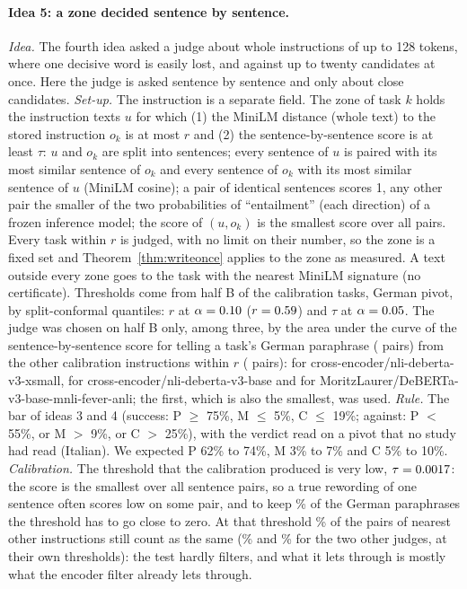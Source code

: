\paragraph{Idea 5: a zone decided sentence by sentence.} \emph{Idea.} The fourth idea asked a judge about whole instructions of up to 128 tokens, where one decisive word is easily lost, and against up to twenty candidates at once. Here the judge is asked sentence by sentence and only about close candidates. \emph{Set-up.} The instruction is a separate field. The zone of task $k$ holds the instruction texts $u$ for which (1) the MiniLM distance (whole text) to the stored instruction $o_k$ is at most $r$ and (2) the sentence-by-sentence score is at least $\tau$: $u$ and $o_k$ are split into sentences;
every sentence of $u$ is paired with its most similar sentence of $o_k$ and every sentence of $o_k$ with its most similar sentence of $u$ (MiniLM cosine); a pair of identical sentences scores 1, any other pair the smaller of the two probabilities of ``entailment'' (each direction) of a frozen inference model; the score of $(u, o_k)$ is the smallest score over all pairs. Every task within $r$ is judged, with no limit on their number, so the zone is a fixed set and Theorem~\ref{thm:writeonce} applies to the zone as measured. A text outside every zone goes to the task with the nearest MiniLM signature (no certificate).
Thresholds come from half B of the calibration tasks, German pivot, by split-conformal quantiles: $r$ at $\alpha = 0.10{}$ ($r = 0.59{}$) and $\tau$ at $\alpha = 0.05{}$. The judge was chosen on half B only, among three, by the area under the curve of the sentence-by-sentence score for telling a task's German paraphrase (\WidenSentPositives{} pairs) from the other calibration instructions within $r$ (\WidenSentNegatives{} pairs):
\WidenSentAucXsmall{} for cross-encoder/nli-deberta-v3-xsmall, \WidenSentAucBase{} for cross-encoder/nli-deberta-v3-base and \WidenSentAucMnli{} for MoritzLaurer/DeBERTa-v3-base-mnli-fever-anli; the first, which is also the smallest, was used.
\emph{Rule.} The bar of ideas 3 and 4 (success: \textsf{P} $\ge$ 75\%, \textsf{M} $\le$ 5\%, \textsf{C} $\le$ 19\%; against: \textsf{P} $<$ 55\%, or \textsf{M} $>$ 9\%, or \textsf{C} $>$ 25\%), with the verdict read on a pivot that no study had read (Italian). We expected \textsf{P} 62\% to 74\%, \textsf{M} 3\% to 7\% and \textsf{C} 5\% to 10\%.
\emph{Calibration.} The threshold that the calibration produced is very low, $\tau = 0.0017{}$: the score is the smallest over all sentence pairs, so a true rewording of one sentence often scores low on some pair, and to keep \WidenSentPosSameXsmall{}\% of the German paraphrases the threshold has to go close to zero. At that threshold \WidenSentNegSameXsmall{}\% of the pairs of nearest other instructions still count as the same (\WidenSentNegSameBase{}\% and \WidenSentNegSameMnli{}\% for the two other judges, at their own thresholds): the test hardly filters, and what it lets through is mostly what the encoder filter already lets through.

